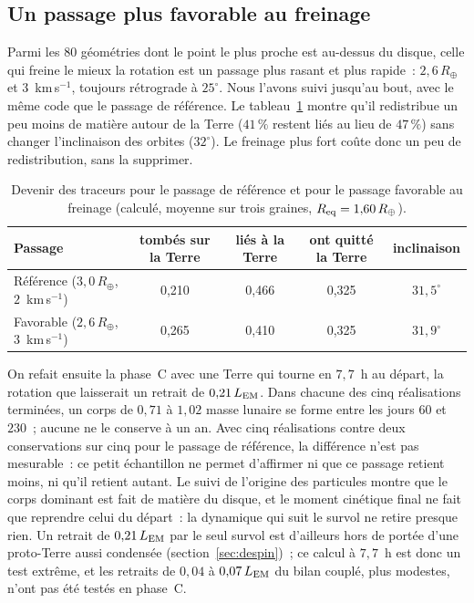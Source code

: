 \documentclass[11pt,a4paper]{article}
\newcommand{\Rt}{\ensuremath{R_\oplus}}
\newcommand{\LEM}{\ensuremath{L_{\rm EM}}}
\newcommand{\Req}{\ensuremath{R_{\rm eq}}}
\begin{document}
\subsection{Un passage plus favorable au freinage}
\label{sec:best}

Parmi les $80$ géométries dont le point le plus proche est au-dessus du disque, celle qui freine le mieux la rotation est un passage plus rasant et plus rapide~: $2{,}6\,\Rt$ et $3$~km\,s$^{-1}$, toujours rétrograde à $25^\circ$. Nous l'avons suivi jusqu'au bout, avec le même code que le passage de référence. Le tableau~\ref{tab:bestB} montre qu'il redistribue un peu moins de matière autour de la Terre ($41\,\%$ restent liés au lieu de $47\,\%$) sans changer l'inclinaison des orbites ($32^\circ$). Le freinage plus fort coûte donc un peu de redistribution, sans la supprimer.

\begin{table}[htbp]
\centering
\caption{Devenir des traceurs pour le passage de référence et pour le passage favorable au freinage (calculé, moyenne sur trois graines, $\Req=1{,}60\,\Rt$).\label{tab:bestB}}
\small
\begin{tabular}{lcccc}
\toprule
Passage & tombés sur la Terre & liés à la Terre & ont quitté la Terre & inclinaison \\
\midrule
Référence ($3{,}0\,\Rt$, $2$~km\,s$^{-1}$) & 0,210 & 0,466 & 0,325 & $31{,}5^\circ$ \\
Favorable ($2{,}6\,\Rt$, $3$~km\,s$^{-1}$) & 0,265 & 0,410 & 0,325 & $31{,}9^\circ$ \\
\bottomrule
\end{tabular}
\end{table}

On refait ensuite la phase~C avec une Terre qui tourne en $7{,}7$~h au départ, la rotation que laisserait un retrait de $0{,}21\,\LEM$. Dans chacune des cinq réalisations terminées, un corps de $0{,}71$ à $1{,}02$ masse lunaire se forme entre les jours $60$ et $230$~; aucune ne le conserve à un an. Avec cinq réalisations contre deux conservations sur cinq pour le passage de référence, la différence n'est pas mesurable~: ce petit échantillon ne permet d'affirmer ni que ce passage retient moins, ni qu'il retient autant. Le suivi de l'origine des particules montre que le corps dominant est fait de matière du disque, et le moment cinétique final ne fait que reprendre celui du départ~: la dynamique qui suit le survol ne retire presque rien. Un retrait de $0{,}21\,\LEM$ par le seul survol est d'ailleurs hors de portée d'une proto-Terre aussi condensée (section~\ref{sec:despin})~; ce calcul à $7{,}7$~h est donc un test extrême, et les retraits de $0{,}04$ à $0{,}07\,\LEM$ du bilan couplé, plus modestes, n'ont pas été testés en phase~C.
\end{document}
